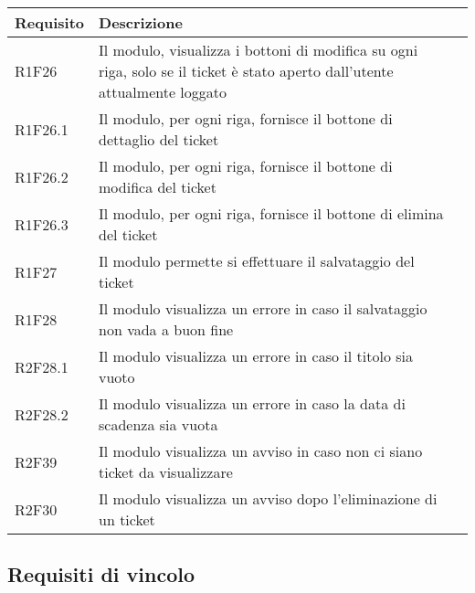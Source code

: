 \pagebreak

\begin{table}[H]
{\renewcommand{\arraystretch}{2}
\begin{tabularx}{\textwidth}{PXl}
\hline\hline
\textbf{Requisito} & \textbf{Descrizione}\\
\hline

R1F26 & Il modulo, visualizza i bottoni di modifica su ogni riga, solo se il ticket è stato aperto dall'utente attualmente loggato \\
\hline
R1F26.1& Il modulo, per ogni riga, fornisce il bottone di dettaglio del ticket \\
\hline
R1F26.2 & Il modulo, per ogni riga, fornisce il bottone di modifica del ticket \\
\hline
R1F26.3 & Il modulo, per ogni riga, fornisce il bottone di elimina del ticket \\
\hline
R1F27 & Il modulo permette si effettuare il salvataggio del ticket\\
\hline
R1F28 & Il modulo visualizza un errore in caso il salvataggio non vada a buon fine \\
\hline
R2F28.1 & Il modulo visualizza un errore in caso il titolo sia vuoto\\
\hline
R2F28.2 & Il modulo visualizza un errore in caso la data di scadenza sia vuota\\
\hline
R2F39 & Il modulo visualizza un avviso in caso non ci siano ticket da visualizzare\\
\hline
R2F30 & Il modulo visualizza un avviso dopo l'eliminazione di un ticket\\
\hline

\end{tabularx}
}
\end{table}

\bigskip

\subsection{Requisiti di vincolo}

